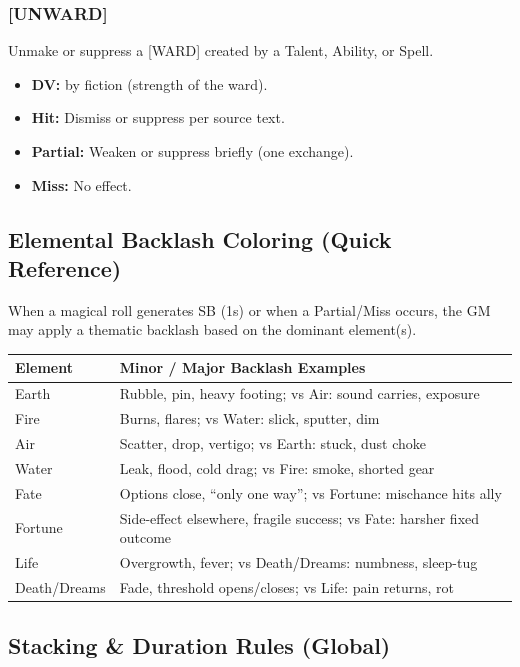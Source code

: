 \subsubsection{[UNWARD]}
Unmake or suppress a [WARD] created by a Talent, Ability, or Spell.
\begin{itemize}
  \item \textbf{DV:} by fiction (strength of the ward).
  \item \textbf{Hit:} Dismiss or suppress per source text.
  \item \textbf{Partial:} Weaken or suppress briefly (one exchange).
  \item \textbf{Miss:} No effect.
\end{itemize}

\subsection{Elemental Backlash Coloring (Quick Reference)}

When a magical roll generates SB (1s) or when a Partial/Miss occurs, the GM may apply a thematic backlash based on the dominant element(s).

\begin{tabular}{@{}>{\raggedright\arraybackslash}p{3cm}>{\raggedright\arraybackslash}p{9.5cm}@{}}
\toprule
\textbf{Element} & \textbf{Minor / Major Backlash Examples} \\
\midrule
Earth & Rubble, pin, heavy footing; vs Air: sound carries, exposure \\
Fire & Burns, flares; vs Water: slick, sputter, dim \\
Air & Scatter, drop, vertigo; vs Earth: stuck, dust choke \\
Water & Leak, flood, cold drag; vs Fire: smoke, shorted gear \\
Fate & Options close, ``only one way''; vs Fortune: mischance hits ally \\
Fortune & Side-effect elsewhere, fragile success; vs Fate: harsher fixed outcome \\
Life & Overgrowth, fever; vs Death/Dreams: numbness, sleep-tug \\
Death/Dreams & Fade, threshold opens/closes; vs Life: pain returns, rot \\
\bottomrule
\end{tabular}

\subsection{Stacking \& Duration Rules (Global)}

